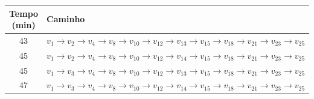 \begin{tabular}{cl}
\toprule
Tempo (min) & Caminho \\
\midrule
43 & $v_{1} \to v_{2} \to v_{4} \to v_{8} \to v_{10} \to v_{12} \to v_{13} \to v_{15} \to v_{18} \to v_{21} \to v_{23} \to v_{25}$ \\
45 & $v_{1} \to v_{2} \to v_{4} \to v_{8} \to v_{10} \to v_{12} \to v_{14} \to v_{15} \to v_{18} \to v_{21} \to v_{23} \to v_{25}$ \\
45 & $v_{1} \to v_{3} \to v_{4} \to v_{8} \to v_{10} \to v_{12} \to v_{13} \to v_{15} \to v_{18} \to v_{21} \to v_{23} \to v_{25}$ \\
47 & $v_{1} \to v_{3} \to v_{4} \to v_{8} \to v_{10} \to v_{12} \to v_{14} \to v_{15} \to v_{18} \to v_{21} \to v_{23} \to v_{25}$ \\
\bottomrule
\end{tabular}
